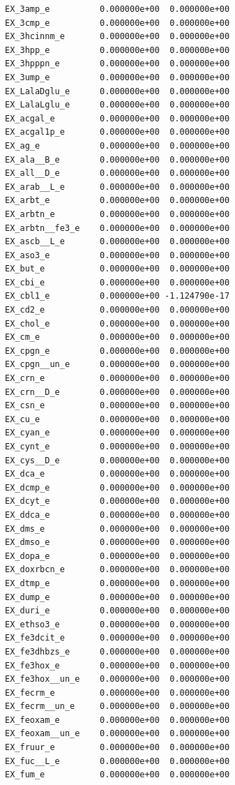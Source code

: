 \documentclass{scrartcl}
\begin{document}
\begin{enumerate}
\begin{lstlisting}
EX_3amp_e          0.000000e+00  0.000000e+00
EX_3cmp_e          0.000000e+00  0.000000e+00
EX_3hcinnm_e       0.000000e+00  0.000000e+00
EX_3hpp_e          0.000000e+00  0.000000e+00
EX_3hpppn_e        0.000000e+00  0.000000e+00
EX_3ump_e          0.000000e+00  0.000000e+00
EX_LalaDglu_e      0.000000e+00  0.000000e+00
EX_LalaLglu_e      0.000000e+00  0.000000e+00
EX_acgal_e         0.000000e+00  0.000000e+00
EX_acgal1p_e       0.000000e+00  0.000000e+00
EX_ag_e            0.000000e+00  0.000000e+00
EX_ala__B_e        0.000000e+00  0.000000e+00
EX_all__D_e        0.000000e+00  0.000000e+00
EX_arab__L_e       0.000000e+00  0.000000e+00
EX_arbt_e          0.000000e+00  0.000000e+00
EX_arbtn_e         0.000000e+00  0.000000e+00
EX_arbtn__fe3_e    0.000000e+00  0.000000e+00
EX_ascb__L_e       0.000000e+00  0.000000e+00
EX_aso3_e          0.000000e+00  0.000000e+00
EX_but_e           0.000000e+00  0.000000e+00
EX_cbi_e           0.000000e+00  0.000000e+00
EX_cbl1_e          0.000000e+00 -1.124790e-17
EX_cd2_e           0.000000e+00  0.000000e+00
EX_chol_e          0.000000e+00  0.000000e+00
EX_cm_e            0.000000e+00  0.000000e+00
EX_cpgn_e          0.000000e+00  0.000000e+00
EX_cpgn__un_e      0.000000e+00  0.000000e+00
EX_crn_e           0.000000e+00  0.000000e+00
EX_crn__D_e        0.000000e+00  0.000000e+00
EX_csn_e           0.000000e+00  0.000000e+00
EX_cu_e            0.000000e+00  0.000000e+00
EX_cyan_e          0.000000e+00  0.000000e+00
EX_cynt_e          0.000000e+00  0.000000e+00
EX_cys__D_e        0.000000e+00  0.000000e+00
EX_dca_e           0.000000e+00  0.000000e+00
EX_dcmp_e          0.000000e+00  0.000000e+00
EX_dcyt_e          0.000000e+00  0.000000e+00
EX_ddca_e          0.000000e+00  0.000000e+00
EX_dms_e           0.000000e+00  0.000000e+00
EX_dmso_e          0.000000e+00  0.000000e+00
EX_dopa_e          0.000000e+00  0.000000e+00
EX_doxrbcn_e       0.000000e+00  0.000000e+00
EX_dtmp_e          0.000000e+00  0.000000e+00
EX_dump_e          0.000000e+00  0.000000e+00
EX_duri_e          0.000000e+00  0.000000e+00
EX_ethso3_e        0.000000e+00  0.000000e+00
EX_fe3dcit_e       0.000000e+00  0.000000e+00
EX_fe3dhbzs_e      0.000000e+00  0.000000e+00
EX_fe3hox_e        0.000000e+00  0.000000e+00
EX_fe3hox__un_e    0.000000e+00  0.000000e+00
EX_fecrm_e         0.000000e+00  0.000000e+00
EX_fecrm__un_e     0.000000e+00  0.000000e+00
EX_feoxam_e        0.000000e+00  0.000000e+00
EX_feoxam__un_e    0.000000e+00  0.000000e+00
EX_fruur_e         0.000000e+00  0.000000e+00
EX_fuc__L_e        0.000000e+00  0.000000e+00
EX_fum_e           0.000000e+00  0.000000e+00

\end{lstlisting}
\end{enumerate}
\end{document}
